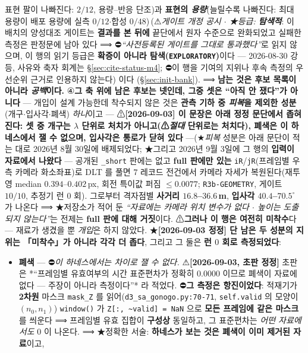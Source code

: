 \documentclass[11pt]{report}
\numberwithin{equation}{chapter}
\numberwithin{figure}{chapter}
\numberwithin{table}{chapter}
\newcommand{\MFourGate}{\,(⚠\emph{게이트 개정 공시 $\cdot$ ★등급: \textbf{탐색적}}:
이 배치의 양성대조 게이트는 \textbf{결과를 본 뒤에} 끝단에서 원자 수준으로 완화되었고
실패한 측정은 판정문에 남아 있다 ⟹ ⛔\emph{``사전등록된 게이트를 그대로 통과했다''}로
읽지 않으며, 이 행의 읽기 등급은 \textbf{확증이 아니라 탐색(\texttt{EXPLORATORY})}이다
--- 2026-08-30 강등, 사유와 축자 회계는 \S\ref{sec:cite-status-m4};
⛔이 행을 기여의 지위나 후속 측정의 우선순위 근거로 인용하지 않는다)}
\begin{document}
표현 팔이 나빠진다: $2/12$, 용량--반응 단조)과 \textbf{표현의 \emph{용량}}(늘릴수록
나빠진다: 최대 용량이 배포 용량에 실측 $0/12$$\cdot$합성 $0/48$)\MFourGate{} 이다
(\S\ref{sec:init-bank}). ⟹ \textbf{남는 것은 후보 목록이 아니라 \emph{공백}이다.}
④\textbf{그 축 위에 남은 후보는 넷인데, 그중 셋은 ``아직 안 쟀다''가 아니다} ---
개입이 설계 가능한데 착수되지 않은 것은 \textbf{관측 기하 중 \emph{피복}을 제외한 성분}
(개구$\cdot$입사각$\cdot$폐색) \emph{하나}이고 --- ⚠\textbf{[2026-09-03] 이 문장은 아래
정정 문단에서 좁혀진다: 셋 중 개구는 $\lambda$ 단위로 처치가 아니고(⚠\emph{절대}
단위로는 처치다), 폐색은 이 하네스에서 잴 수 없으며,
입사각은 통로가 닫혀 있다} ---(★\emph{피복} 성분은 아래 문단이 적는 대로
2026년 8월 30일에 배제되었다;
★그리고 2026년 9월 3일에 그 행의 \textbf{입력이 자료에서 나왔다} --- 공개된
\texttt{\_short} 판에는 없고 \textbf{full 판에만 있는} \texttt{iR}/\texttt{jR}(프레임별 우측
카메라 화소좌표)로 DLT 를 풀면 $7$ 레코드 전건에서 카메라 자세가 복원된다(재투영 median
$0.394$--$0.402$\,px, 회전 특이값 퍼짐 $\le 0.0077$; \texttt{R3b-GEOMETRY}, 게이트 $10/10$,
추정기 런 $0$ 회). 그로부터 격자점별 \textbf{사거리 $16.8$--$36.6$\,m}, \textbf{입사각
$40.4$--$70.5^\circ$} 가 나온다 ⟹ ★저장소가 적어 둔 \emph{``자료에는 카메라 위치 변수가
없다 $\cdot$ 높이는 도출되지 않는다''}는 전제는 \textbf{full 판에 대해 거짓}이다.
⚠\textbf{그러나 이 행은 여전히 미착수}다 --- 재료가 생겼을 뿐 \emph{개입}은 하지 않았다.
★\textbf{[2026-09-03 정정] 단 남은 두 성분의 지위는 「미착수」가 아니라 각각 더 좁다},
그리고 그 둘은 \textbf{런 $0$ 회로 측정되었다}:
\begin{itemize}
  \item \textbf{폐색} --- ⛔\emph{이 하네스에서는 차이로 잴 수 없다.}
        ⚠\textbf{[2026-09-03, 초판 정정]} 초판은 *``프레임별 유효여부의 시간 표준편차가
        정확히 $0.0000$ 이므로 폐색이 자료에 없다 --- 주장이 아니라 측정이다''* 라
        적었다. ⛔\textbf{그 측정은 항진이었다}: 적재기가 \textbf{2차원} 마스크
        \texttt{mask\_Z} 를 읽어(\texttt{d3\_sa\_gonogo.py:70-71},
        \texttt{self.valid} 의 모양이 $(n_0,n_1)$) \texttt{window()} 가
        \texttt{Z[:, \textasciitilde valid] = NaN} 으로 \textbf{모든 프레임에 같은
        마스크}를 씌운다 ⟹ 프레임별 유효 집합이 \textbf{구성상} 동일하고, 그 표준편차는
        \emph{어떤 자료에서도} $0$ 이 나온다.
        ⟹ ★정확한 서술: \textbf{하네스가 보는 것은 폐색이 이미 제거된 자료}이고,

\end{itemize}$$
\end{document}
